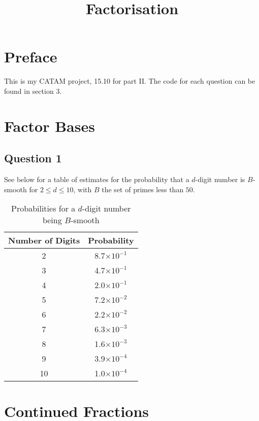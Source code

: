 \documentclass{article}
\begin{document}
\title{Factorisation}
\maketitle
\tableofcontents
\newpage
\section*{Preface}
This is my CATAM project,  15.10 for part II. The code for each question can be found in section $3$.
\newpage
\section{Factor Bases}
\subsection{Question 1}
See below for a table of estimates for the probability that a $d$-digit number is $B$-smooth for $2\le d\le 10$,  with $B$ the set of primes less than $50$. 

\begin{table}[hp]
\begin{center}
\begin{tabular}{|c|c|}
\hline
Number of Digits & Probability         \\ \hline
2                & 8.7$\times 10^{-1}$ \\
3                & 4.7$\times 10^{-1}$ \\
4                & 2.0$\times 10^{-1}$ \\
5                & 7.2$\times 10^{-2}$ \\
6                & 2.2$\times 10^{-2}$ \\
7                & 6.3$\times 10^{-3}$ \\
8                & 1.6$\times 10^{-3}$ \\
9                & 3.9$\times 10^{-4}$ \\
10               & 1.0$\times 10^{-4}$ \\ \hline
\end{tabular}
\caption{Probabilities for a $d$-digit number being $B$-smooth}
\end{center}
\end{table}

\section{Continued Fractions}
\end{document}
